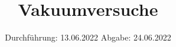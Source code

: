 

\subject{V70}
\title{Vakuumversuche}
\date{%
  Durchführung: 13.06.2022
  \hspace{3em}
  Abgabe: 24.06.2022
}



\maketitle
\thispagestyle{empty}
\tableofcontents
\newpage









\nocite{*}
\printbibliography{}


